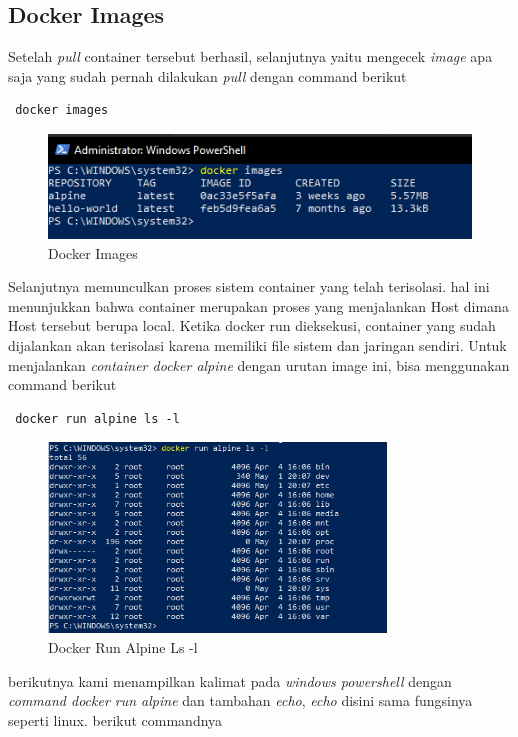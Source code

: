 \documentclass[11pt,a4paper]{article}
\begin{document}
 \subsection{Docker Images}
 Setelah \textit{pull} container tersebut berhasil, selanjutnya yaitu mengecek \textit{image} apa saja yang sudah pernah dilakukan \textit{pull} dengan command berikut
 \begin{lstlisting}
 docker images\end{lstlisting}
 \begin{figure}[h]
     \centering
     \includegraphics{Figure/8. images.png}
     \caption{Docker Images}
 \end{figure}
 Selanjutnya memunculkan proses sistem container yang telah terisolasi. hal ini menunjukkan bahwa container merupakan proses yang menjalankan Host dimana Host tersebut berupa local. Ketika docker run dieksekusi, container yang sudah dijalankan akan terisolasi karena memiliki file sistem dan jaringan sendiri. Untuk menjalankan \textit{container docker alpine} dengan urutan image ini, bisa menggunakan command berikut
 \begin{lstlisting}
 docker run alpine ls -l\end{lstlisting}
 \begin{figure}[h]
     \centering
     \includegraphics[width=0.8\textwidth]{Figure/9. show proses container.png}
     \caption{Docker Run Alpine Ls -l}
 \end{figure}
 berikutnya kami menampilkan kalimat pada \textit{windows powershell} dengan \textit{command docker run alpine} dan tambahan \textit{echo}, \textit{echo} disini sama fungsinya seperti linux. berikut commandnya
\end{document}
